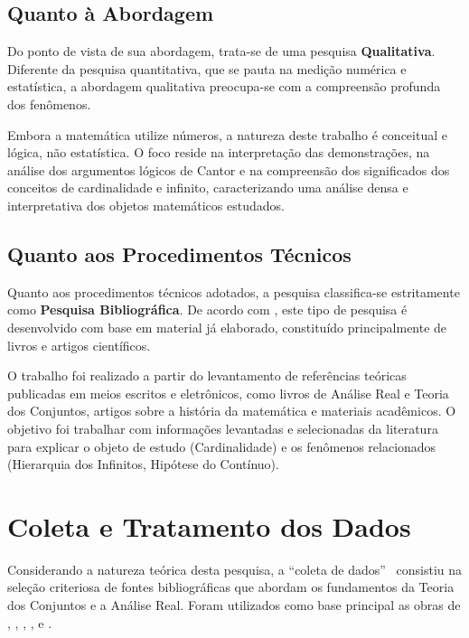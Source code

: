 \subsection{Quanto à Abordagem}

Do ponto de vista de sua abordagem, trata-se de uma pesquisa \textbf{Qualitativa}. Diferente da pesquisa quantitativa, que se pauta na medição numérica e estatística, a abordagem qualitativa preocupa-se com a compreensão profunda dos fenômenos.

Embora a matemática utilize números, a natureza deste trabalho é conceitual e lógica, não estatística. O foco reside na interpretação das demonstrações, na análise dos argumentos lógicos de Cantor e na compreensão dos significados dos conceitos de cardinalidade e infinito, caracterizando uma análise densa e interpretativa dos objetos matemáticos estudados.

\subsection{Quanto aos Procedimentos Técnicos}

Quanto aos procedimentos técnicos adotados, a pesquisa classifica-se estritamente como \textbf{Pesquisa Bibliográfica}. De acordo com \textcite[p.~44]{gil2002}, este tipo de pesquisa é desenvolvido com base em material já elaborado, constituído principalmente de livros e artigos científicos.

O trabalho foi realizado a partir do levantamento de referências teóricas publicadas em meios escritos e eletrônicos, como livros de Análise Real e Teoria dos Conjuntos, artigos sobre a história da matemática e materiais acadêmicos. O objetivo foi trabalhar com informações levantadas e selecionadas da literatura para explicar o objeto de estudo (Cardinalidade) e os fenômenos relacionados (Hierarquia dos Infinitos, Hipótese do Contínuo).

\section{Coleta e Tratamento dos Dados}
\label{sec:coleta_e_tratamento}

Considerando a natureza teórica desta pesquisa, a ``coleta de dados'' \ consistiu na seleção criteriosa de fontes bibliográficas que abordam os fundamentos da Teoria dos Conjuntos e a Análise Real. Foram utilizados como base principal as obras de \textcite{halmos2014}, \textcite{aigner2018}, \textcite{doets2022}, \textcite{enderton1977}, \textcite{hausdorff1962} e \textcite{suppes1972}.

